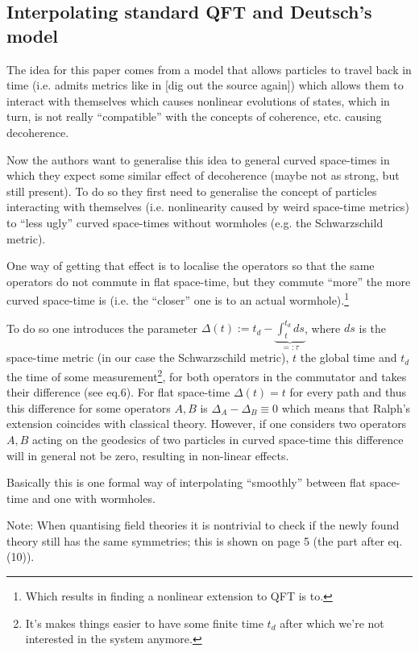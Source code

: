 \documentclass[11pt]{report}
\begin{document}
\subsection{Interpolating standard QFT and Deutsch's model}

The idea for this paper comes from a model that allows particles to travel back in time (i.e. admits metrics like in [dig out the source again]) which allows them to interact with themselves which causes nonlinear evolutions of states, which in turn, is not really ``compatible'' with the concepts of coherence, etc. causing decoherence.
		
Now the authors want to generalise this idea to general curved space-times in which they expect some similar effect of decoherence (maybe not as strong, but still present). To do so they first need to generalise the concept of particles interacting with themselves (i.e. nonlinearity caused by weird space-time metrics) to ``less ugly'' curved space-times without wormholes (e.g. the Schwarzschild metric).

One way of getting that effect is to localise the operators so that the same operators do not commute in flat space-time, but they commute ``more'' the more curved space-time is (i.e. the ``closer'' one is to an actual wormhole).\footnote{Which results in finding a nonlinear extension to QFT is to.}

To do so one introduces the parameter $\Delta(t) := t_d - \underbrace{\int_t^{t_d}ds}_{=:\tau}$, where $ds$ is the space-time metric (in our case the Schwarzschild metric), $t$ the global time and $t_d$ the time of some measurement\footnote{It's makes things easier to have some finite time $t_d$ after which we're not interested in the system anymore.}, for both operators in the commutator and takes their difference (see eq.6). For flat space-time $\Delta(t)=t$ for every path and thus this difference for some operators $A,B$ is $\Delta_A - \Delta_B \equiv 0$ which means that Ralph's extension coincides with classical theory. However, if one considers two operators $A,B$ acting on the geodesics of two particles in curved space-time this difference will in general not be zero, resulting in non-linear effects.

Basically this is one formal way of interpolating ``smoothly'' between flat space-time and one with wormholes.

Note: When quantising field theories it is nontrivial to check if the newly found theory still has the same symmetries; this is shown on page 5 (the part after eq.(10)).
\end{document}
